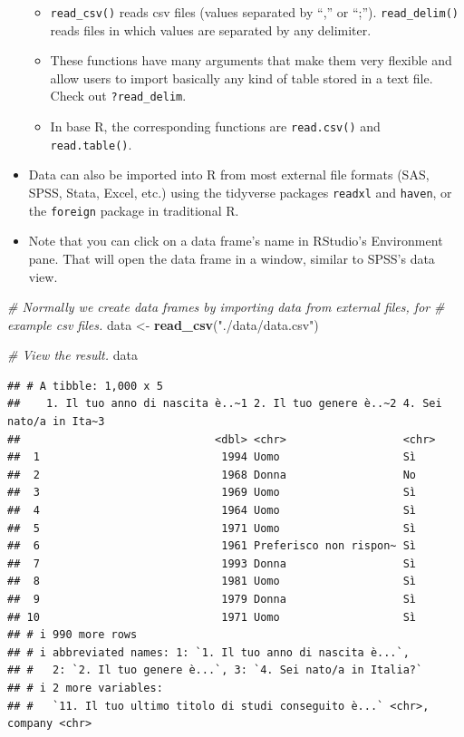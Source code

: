\documentclass[
]{book}
\newenvironment{Shaded}{\begin{snugshade}}{\end{snugshade}}
\newcommand{\CommentTok}[1]{\textcolor[rgb]{0.56,0.35,0.01}{\textit{#1}}}
\newcommand{\FunctionTok}[1]{\textcolor[rgb]{0.13,0.29,0.53}{\textbf{#1}}}
\newcommand{\NormalTok}[1]{#1}
\newcommand{\OtherTok}[1]{\textcolor[rgb]{0.56,0.35,0.01}{#1}}
\newcommand{\StringTok}[1]{\textcolor[rgb]{0.31,0.60,0.02}{#1}}
\providecommand{\tightlist}{%
  \setlength{\itemsep}{0pt}\setlength{\parskip}{0pt}}
\begin{document}
\begin{itemize}
  \begin{itemize}
  \tightlist
  \item
    \texttt{read\_csv()} reads csv files (values separated by ``,'' or ``;''). \texttt{read\_delim()} reads files in which values are separated by any delimiter.
  \item
    These functions have many arguments that make them very flexible and allow users to import basically any kind of table stored in a text file. Check out \texttt{?read\_delim}.
  \item
    In base R, the corresponding functions are \texttt{read.csv()} and \texttt{read.table()}.
  \end{itemize}
\item
  Data can also be imported into R from most external file formats (SAS, SPSS, Stata, Excel, etc.) using the tidyverse packages \texttt{readxl} and \texttt{haven}, or the \texttt{foreign} package in traditional R.
\item
  Note that you can click on a data frame's name in RStudio's Environment pane. That will open the data frame in a window, similar to SPSS's data view.
\end{itemize}

\begin{Shaded}
\begin{Highlighting}[]
\CommentTok{\# Normally we create data frames by importing data from external files, for}
\CommentTok{\# example csv files.}
\NormalTok{data }\OtherTok{\textless{}{-}} \FunctionTok{read\_csv}\NormalTok{(}\StringTok{"./data/data.csv"}\NormalTok{)}

\CommentTok{\# View the result.}
\NormalTok{data}
\end{Highlighting}
\end{Shaded}

\begin{verbatim}
## # A tibble: 1,000 x 5
##    1. Il tuo anno di nascita è..~1 2. Il tuo genere è..~2 4. Sei nato/a in Ita~3
##                              <dbl> <chr>                  <chr>                 
##  1                            1994 Uomo                   Sì                    
##  2                            1968 Donna                  No                    
##  3                            1969 Uomo                   Sì                    
##  4                            1964 Uomo                   Sì                    
##  5                            1971 Uomo                   Sì                    
##  6                            1961 Preferisco non rispon~ Sì                    
##  7                            1993 Donna                  Sì                    
##  8                            1981 Uomo                   Sì                    
##  9                            1979 Donna                  Sì                    
## 10                            1971 Uomo                   Sì                    
## # i 990 more rows
## # i abbreviated names: 1: `1. Il tuo anno di nascita è...`,
## #   2: `2. Il tuo genere è...`, 3: `4. Sei nato/a in Italia?`
## # i 2 more variables:
## #   `11. Il tuo ultimo titolo di studi conseguito è...` <chr>, company <chr>
\end{verbatim}
\end{document}
